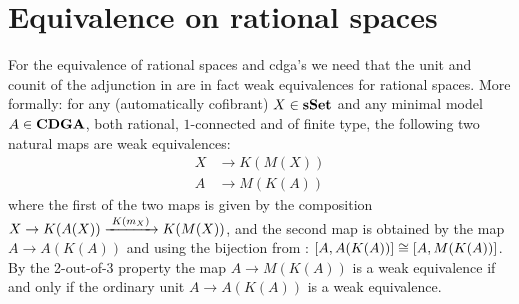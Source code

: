 \section{Equivalence on rational spaces}
For the equivalence of rational spaces and cdga's we need that the unit and counit of the adjunction in  are in fact weak equivalences for rational spaces. More formally: for any (automatically cofibrant) $X \in \mathbf{s{\mathbf{Set}}}$ and any minimal model $A \in \mathbf{CDGA}$, both rational, $1$-connected and of finite type, the following two natural maps are weak equivalences:
\begin{align*}
	X &\to K(M(X)) \\
	A &\to M(K(A))
\end{align*}
where the first of the two maps is given by the composition $X \to K(A(X)) \xrightarrow{\,\,{K(m_X)}\,\,} K(M(X))$,
and the second map is obtained by the map $A \to A(K(A))$ and using the bijection from : $[A, A(K(A))] \cong [A, M(K(A))]$. By the 2-out-of-3 property the map $A \to M(K(A))$ is a weak equivalence if and only if the ordinary unit $A \to A(K(A))$ is a weak equivalence.



